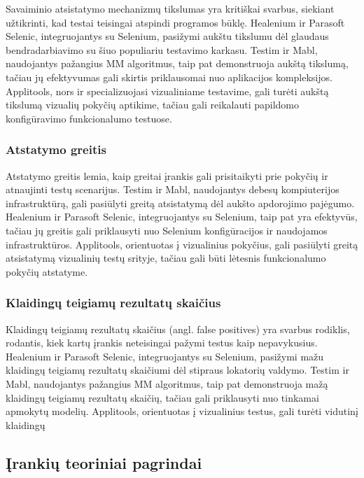 \documentclass[
]{VUMIFPSkursinis}
\begin{document}
Savaiminio atsistatymo mechanizmų tikslumas yra kritiškai svarbus, siekiant užtikrinti, kad testai teisingai atspindi programos būklę. Healenium ir Parasoft Selenic, integruojantys su Selenium, pasižymi aukštu tikslumu dėl glaudaus bendradarbiavimo su šiuo populiariu testavimo karkasu. Testim ir Mabl, naudojantys pažangius MM algoritmus, taip pat demonstruoja aukštą tikslumą, tačiau jų efektyvumas gali skirtis priklausomai nuo aplikacijos kompleksijos. Applitools, nors ir specializuojasi vizualiniame testavime, gali turėti aukštą tikslumą vizualių pokyčių aptikime, tačiau gali reikalauti papildomo konfigūravimo funkcionalumo testuose.

\subsubsection{Atstatymo greitis}

Atstatymo greitis lemia, kaip greitai įrankis gali prisitaikyti prie pokyčių ir atnaujinti testų scenarijus. Testim ir Mabl, naudojantys debesų kompiuterijos infrastruktūrą, gali pasiūlyti greitą atsistatymą dėl aukšto apdorojimo pajėgumo. Healenium ir Parasoft Selenic, integruojantys su Selenium, taip pat yra efektyvūs, tačiau jų greitis gali priklausyti nuo Selenium konfigūracijos ir naudojamos infrastruktūros. Applitools, orientuotas į vizualinius pokyčius, gali pasiūlyti greitą atsistatymą vizualinių testų srityje, tačiau gali būti lėtesnis funkcionalumo pokyčių atstatyme.

\subsubsection{Klaidingų teigiamų rezultatų skaičius}

Klaidingų teigiamų rezultatų skaičius (angl. false positives) yra svarbus rodiklis, rodantis, kiek kartų įrankis neteisingai pažymi testus kaip nepavykusius. Healenium ir Parasoft Selenic, integruojantys su Selenium, pasižymi mažu klaidingų teigiamų rezultatų skaičiumi dėl stipraus lokatorių valdymo. Testim ir Mabl, naudojantys pažangius MM algoritmus, taip pat demonstruoja mažą klaidingų teigiamų rezultatų skaičių, tačiau gali priklausyti nuo tinkamai apmokytų modelių. Applitools, orientuotas į vizualinius testus, gali turėti vidutinį klaidingų

\subsection{Įrankių teoriniai pagrindai}
\end{document}
